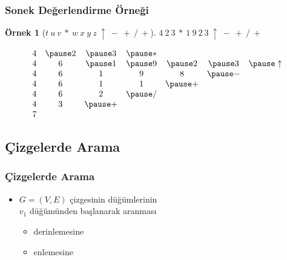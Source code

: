 \documentclass[dvipsnames]{beamer}
\theoremstyle{definition}
\theoremstyle{example}
\newtheorem{ornek}[theorem]{Örnek}
\theoremstyle{plain}
\begin{document}
\begin{frame}
  \frametitle{Sonek Değerlendirme Örneği}

  \begin{ornek}[$t ~ u ~ v ~ * ~ w ~ x ~ y ~ z ~ \uparrow ~ - ~ + ~ / ~ +$]
    $4 ~ 2 ~ 3 ~ * ~ 1 ~ 9 ~ 2 ~ 3 ~ \uparrow ~ - ~ + ~ / ~ +$

    \pause
    \medskip
    \[
      \begin{array}{ccccccc}
  4 & \pause 2 & \pause 3 & \pause * &          &          &                \\
  4 &        6 & \pause 1 & \pause 9 & \pause 2 & \pause 3 & \pause \uparrow\\
  4 &        6 &        1 &        9 &        8 & \pause - &                \\
  4 &        6 &        1 &        1 & \pause + &          &                \\
  4 &        6 &        2 & \pause / &          &          &                \\
  4 &        3 & \pause + &          &          &          &                \\
  7 &          &          &          &          &          &                \\
      \end{array}
    \]
  \end{ornek}
\end{frame}

\subsection{Çizgelerde Arama}

\begin{frame}
  \frametitle{Çizgelerde Arama}

  \begin{itemize}
    \item $G=(V,E)$ çizgesinin düğümlerinin\\
      $v_1$ düğümünden başlanarak aranması
    \begin{itemize}
      \item derinlemesine
      \item enlemesine
    \end{itemize}
  \end{itemize}
\end{frame}
\end{document}
